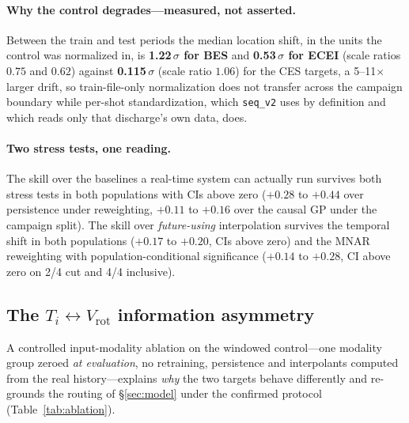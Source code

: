 \documentclass[10pt]{article}
\newcommand{\Ti}{\ensuremath{T_i}}
\newcommand{\Vrot}{\ensuremath{V_\mathrm{rot}}}
\newcommand{\seqv}{\texttt{seq\_v2}}
\begin{document}
\paragraph{Why the control degrades---measured, not asserted.}
Between the train and test periods the median location shift, in the units the
control was normalized in, is \textbf{1.22\,$\sigma$ for BES} and
\textbf{0.53\,$\sigma$ for ECEI} (scale ratios $0.75$ and $0.62$) against
\textbf{0.115\,$\sigma$} (scale ratio $1.06$) for the CES targets, a 5--11$\times$
larger drift, so train-file-only normalization does not transfer across the campaign
boundary while per-shot standardization, which \seqv{} uses by definition and which
reads only that discharge's own data, does.

\paragraph{Two stress tests, one reading.}
The skill
over the baselines a real-time system can actually run survives both stress tests
in both populations with CIs above zero ($+0.28$ to $+0.44$ over persistence under
reweighting, $+0.11$ to $+0.16$ over the causal GP under the campaign split). The
skill over \emph{future-using} interpolation survives the temporal shift in both
populations ($+0.17$ to $+0.20$, CIs above zero) and the MNAR reweighting with
population-conditional significance ($+0.14$ to $+0.28$, CI above zero on 2/4 cut
and 4/4 inclusive).

\subsection{The \Ti$\leftrightarrow$\Vrot{} information asymmetry}
\label{sec:asym}
A controlled input-modality ablation on the windowed control---one modality group
zeroed \emph{at evaluation}, no retraining, persistence and interpolants computed
from the real history---explains \emph{why} the two targets behave differently and
re-grounds the routing of \S\ref{sec:model} under the confirmed protocol
(Table~\ref{tab:ablation}).
\end{document}
